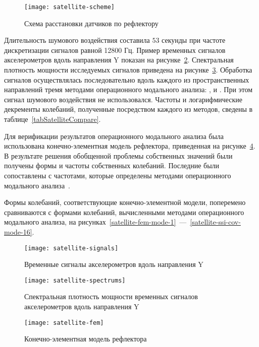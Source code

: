 \begin{figure}[!htb]
	\centerfloat
	\texttt{[image: satellite-scheme]}
	\caption{Схема расстановки датчиков по рефлектору} \label{satellite-scheme}
\end{figure}

Длительность шумового воздействия составила $ 53 $ секунды при частоте дискретизации сигналов равной 12800 Гц. Пример временных сигналов акселерометров вдоль направления Y показан на рисунке~\ref{satellite-signals}. Спектральная плотность мощности исследуемых сигналов приведена на рисунке~\ref{satellite-spectrums}. Обработка сигналов осуществлялась последовательно вдоль каждого из пространственных направлений тремя методами операционного модального анализа: ,  и . При этом сигнал шумового воздействия не использовался. Частоты и логарифмические декременты колебаний, полученные посредством каждого из методов, сведены в таблице~\ref{tabSatelliteCompare}.

Для верификации результатов операционного модального анализа была использована конечно-элементная модель рефлектора, приведенная на рисунке~\ref{satellite-fem}. В результате решения обобщенной проблемы собственных значений были получены формы и частоты собственных колебаний. Последние были сопоставлены с частотами, которые определены методами операционного модального анализа~. 

Формы колебаний, соответствующие конечно-элементной модели, поперемено сравниваются с формами колебаний, вычисленными методами операционного модального анализа, на рисунках~\ref{satellite-fem-mode-1}~---~\ref{satellite-ssi-cov-mode-16}.

\begin{figure}[!htb]
	\centerfloat
	\texttt{[image: satellite-signals]}
	\caption{Временные сигналы акселерометров вдоль направления Y} \label{satellite-signals}
\end{figure}

\begin{figure}[!htb]
	\centerfloat
	\texttt{[image: satellite-spectrums]}
	\caption{Спектральная плотность мощности временных сигналов акселерометров вдоль направления Y} \label{satellite-spectrums}
\end{figure}

\begin{figure}[!htb]
	\centerfloat
	\texttt{[image: satellite-fem]}
	\caption{Конечно-элементная модель рефлектора} \label{satellite-fem}
\end{figure}

